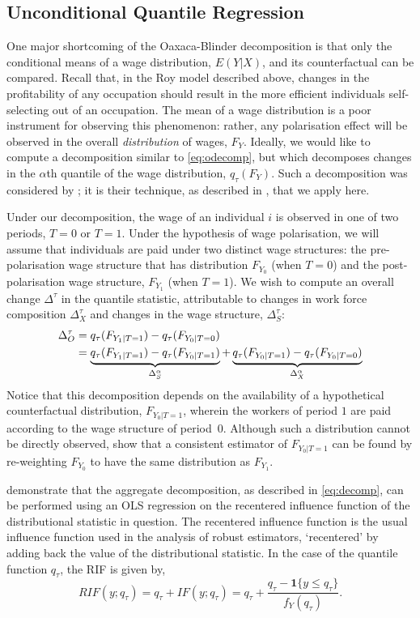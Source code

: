 \subsection{Unconditional Quantile Regression}
One major shortcoming of the Oaxaca-Blinder decomposition is that only the conditional means of a wage distribution, $E(Y|X)$, and its counterfactual can be compared. Recall that, in the Roy model described above, changes in the profitability of any occupation should result in the more efficient individuals self-selecting out of an occupation. The mean of a wage distribution is a poor instrument for observing this phenomenon: rather, any polarisation effect will be observed in the overall {\em distribution} of wages, $F_Y$. Ideally, we would like to compute a decomposition similar to \eqref{eq:odecomp}, but which decomposes changes in the $\alpha$th quantile of the wage distribution, $q_\tau(F_Y)$. Such a decomposition was considered by \citet{Firpo2011}; it is their technique, as described in \citet{Firpo2009}, that we apply here.

Under our decomposition, the wage of an individual $i$ is observed in one of two periods, $T=0$ or $T=1$. Under the hypothesis of wage polarisation, we will assume that individuals are paid under two distinct wage structures: the pre-polarisation wage structure that has distribution $F_{Y_0}$ (when $T=0$) and the post-polarisation wage structure, $F_{Y_1}$ (when $T=1$). We wish to compute an overall change $\Delta^\tau$ in the quantile statistic, attributable to changes in work force composition $\Delta^\tau_X$ and changes in the wage structure, $\Delta^\tau_S$:
\begin{align}
  \Delta^\tau_O &= q_\tau(F_{Y_1|T=1}) - q_\tau(F_{Y_0|T=0}) \notag \\
  &= \underbrace{q_\tau(F_{Y_1|T=1}) -  q_\tau(F_{Y_0|T=1})}_{\Delta^\alpha_S} + \underbrace{q_\tau(F_{Y_0|T=1}) - q_\tau(F_{Y_0|T=0})}_{\Delta^\alpha_X} \label{eq:decomp}
\end{align}Notice that this decomposition depends on the availability of a hypothetical counterfactual distribution, $F_{Y_0|T=1}$, wherein the workers of period $1$ are paid according to the wage structure of period~$0$. Although such a distribution cannot be directly observed, \citet{Firpo2011} show that a consistent estimator of $F_{Y_0|T=1}$ can be found by re-weighting $F_{Y_0}$ to have the same distribution as $F_{Y_1}$.

\citet{Firpo2009} demonstrate that the aggregate decomposition, as described in \eqref{eq:decomp}, can be performed using an OLS regression on the recentered influence function of the distributional statistic in question. The recentered influence function is the usual influence function used in the analysis of robust estimators, `recentered' by adding back the value of the distributional statistic. In the case of the quantile function $q_\tau$, the RIF is given by,
$$ RIF(y; q_\tau) = q_\tau + IF(y; q_\tau) = q_\tau + \frac{q_\tau - \mathbf{1}\{y \leq q_\tau\}}{f_Y(q_\tau)}. $$

